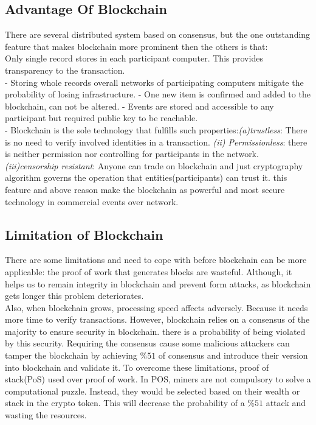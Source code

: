 \subsection{Advantage Of Blockchain}
There are several distributed system based on consensus, but the one outstanding feature that makes blockchain  more prominent then the others is that:\\
Only single record stores in each participant computer. This provides transparency to the transaction.\\ 
- Storing whole records overall networks of participating computers mitigate the probability of losing infrastructure.
- One new item is confirmed and added to the blockchain, can not be altered.
- Events are stored and accessible to any participant but required public key to be reachable\cite{Sharples}.\\
- Blockchain is the sole technology that fulfills such properties:\textit{(a)trustless}: There is no need to verify involved identities in a transaction. \textit{(ii) Permissionless}: there is neither permission nor controlling for participants in the network.   \textit{(iii)censorship resistant}: Anyone can trade on blockchain and just cryptography algorithm governs the operation that entities(participants) can trust it.
this feature and above reason make the blockchain as powerful and most secure technology in commercial events over network\cite{Panarello}.


\subsection{Limitation of Blockchain}
There are some limitations and need to cope with before blockchain can be more applicable: the proof of work that generates blocks are wasteful. Although, it helps us to remain integrity in blockchain and prevent form attacks, as blockchain gets longer this problem deteriorates.\\
Also, when blockchain grows, processing speed affects adversely. Because it needs more time to verify transactions. However, blockchain relies on a consensus of the majority to ensure security in blockchain. there is a probability of being violated by this security. Requiring the consensus cause some malicious attackers can tamper the blockchain by achieving $\%51$ of consensus and introduce their version into blockchain and validate it.
To overcome these limitations, proof of stack(PoS) used over proof of work. In POS, miners are not compulsory to solve a computational puzzle. Instead, they would be selected based on their wealth or stack in the crypto token. This will decrease the probability of a $\%51$ attack and wasting the resources.

